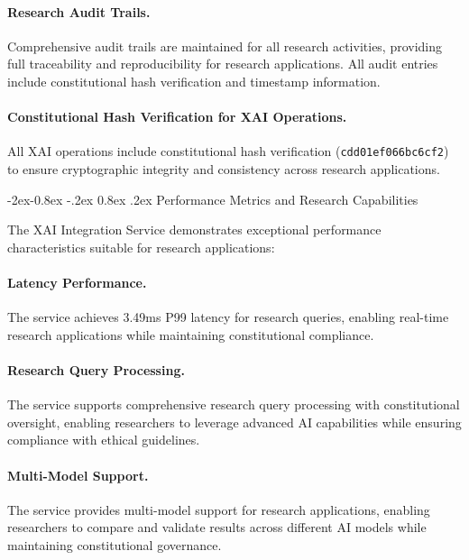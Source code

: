 \documentclass[manuscript,screen,9pt]{acmart}
\makeatletter
\renewcommand\subsubsection{\@startsection{subsubsection}{3}{\z@}%
  {-2ex\@plus -0.8ex \@minus -.2ex}%
  {0.8ex \@plus .2ex}%
  {\normalfont\normalsize\bfseries}}
\makeatother
\begin{document}
\paragraph{Research Audit Trails.} Comprehensive audit trails are maintained for all research activities, providing full traceability and reproducibility for research applications. All audit entries include constitutional hash verification and timestamp information.

\paragraph{Constitutional Hash Verification for XAI Operations.} All XAI operations include constitutional hash verification (\texttt{\small{cdd01ef066bc6cf2}}) to ensure cryptographic integrity and consistency across research applications.

\subsubsection{Performance Metrics and Research Capabilities}
\label{subsubsec:xai_performance_metrics}

The XAI Integration Service demonstrates exceptional performance characteristics suitable for research applications:

\paragraph{Latency Performance.} The service achieves 3.49ms P99 latency for research queries, enabling real-time research applications while maintaining constitutional compliance.

\paragraph{Research Query Processing.} The service supports comprehensive research query processing with constitutional oversight, enabling researchers to leverage advanced AI capabilities while ensuring compliance with ethical guidelines.

\paragraph{Multi-Model Support.} The service provides multi-model support for research applications, enabling researchers to compare and validate results across different AI models while maintaining constitutional governance.
\end{document}
